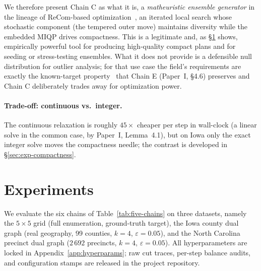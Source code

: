 \documentclass[11pt]{article}
\begin{document}
We therefore present Chain C as what it is, a \emph{matheuristic
ensemble generator} in the lineage of ReCom-based
optimization~\cite{cannon2023voting,brous2025recom}, an iterated
local search whose stochastic component (the tempered outer move)
maintains diversity while the embedded MIQP drives compactness. This
is a legitimate and, as \S\ref{sec:experiments} shows, empirically
powerful tool for producing high-quality compact plans and for
seeding or stress-testing ensembles. What it does not provide is a
defensible null distribution for outlier analysis; for that use case
the field's requirements are exactly the known-target
property~\cite{cannon2022spanning,mccartan2023sequential} that
Chain E (Paper~I, \S4.6) preserves and Chain C deliberately trades
away for optimization power.

\paragraph{Trade-off: continuous vs.\ integer.}\label{sec:iqp-pareto}
The continuous relaxation is roughly $45\times$ cheaper per step in
wall-clock (a linear solve in the common case, by
Paper~I, Lemma~4.1), but on Iowa only the exact integer
solve moves the compactness needle; the contrast is developed in
\S\ref{sec:exp-compactness}.

\section{Experiments}\label{sec:experiments}

We evaluate the six chains of Table~\ref{tab:five-chains} on three
datasets, namely the $5 \times 5$ grid (full enumeration, ground-truth
target), the Iowa county dual graph (real geography, 99 counties,
$k = 4$, $\varepsilon = 0.05$), and the North Carolina precinct dual
graph ($2\,692$ precincts, $k = 4$, $\varepsilon = 0.05$). All hyperparameters are
locked in Appendix~\ref{app:hyperparams}; raw cut traces, per-step
balance audits, and configuration stamps are released in the project
repository.
\end{document}
